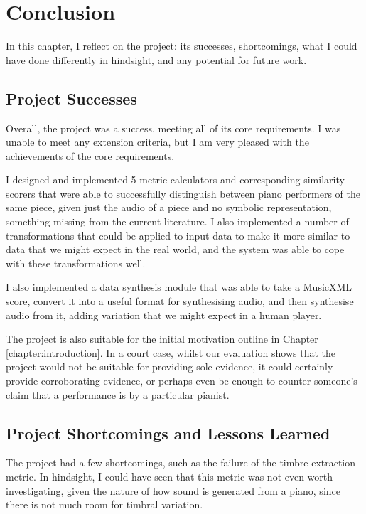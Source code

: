\documentclass[oneside, class=book, 12pt, crop=false]{standalone}
\begin{document}
\ifstandalone
  \setcounter{chapter}{4}
  \chapter{Conclusion}
\fi
{}


In this chapter, I reflect on the project: its successes, shortcomings, what I could have done differently in hindsight, and any potential for future work.

\section{Project Successes}

Overall, the project was a success, meeting all of its core requirements. I was unable to meet any extension criteria, but I am very pleased with the achievements of the core requirements.

I designed and implemented 5 metric calculators and corresponding similarity scorers that were able to successfully distinguish between piano performers of the same piece, given just the audio of a piece and no symbolic representation, something missing from the current literature. I also implemented a number of transformations that could be applied to input data to make it more similar to data that we might expect in the real world, and the system was able to cope with these transformations well.

I also implemented a data synthesis module that was able to take a MusicXML score, convert it into a useful format for synthesising audio, and then synthesise audio from it, adding variation that we might expect in a human player. 

The project is also suitable for the initial motivation outline in Chapter \ref{chapter:introduction}. In a court case, whilst our evaluation shows that the project would not be suitable for providing sole evidence, it could certainly provide corroborating evidence, or perhaps even be enough to counter someone's claim that a performance is by a particular pianist.

\section{Project Shortcomings and Lessons Learned}

The project had a few shortcomings, such as the failure of the timbre extraction metric. In hindsight, I could have seen that this metric was not even worth investigating, given the nature of how sound is generated from a piano, since there is not much room for timbral variation.
\end{document}
